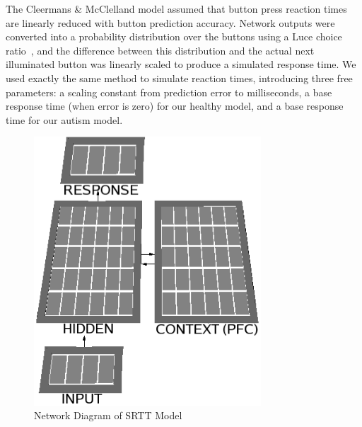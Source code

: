 The Cleermans \& McClelland model assumed that button press reaction times are linearly reduced with button prediction accuracy. Network outputs were converted into a probability distribution over the buttons using a Luce choice ratio~\cite{Luce:1963}, and the difference between this distribution and the actual next illuminated button was linearly scaled to produce a simulated response time. We used exactly the same method to simulate reaction times, introducing three free parameters: a scaling constant from prediction error to milliseconds, a base response time (when error is zero) for our healthy model, and a base response time for our autism model.


\begin{figure}[t]
\begin{center}
	\includegraphics[width=85mm]{figures/srtt_network.eps}
\end{center}
\caption{Network Diagram of SRTT Model} 
\label{network-diagram-srtt}
\end{figure}

